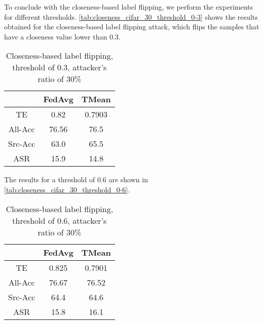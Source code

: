 To conclude with the closeness-based label flipping, we perform the experiments for different thresholds. \autoref{tab:closeness_cifar_30_threshold_0-3} shows the results obtained for the closeness-based label flipping attack, which flips the samples that have a closeness value lower than 0.3.

\begin{table}[h!]
        \centering
        \small
        \begin{adjustbox}{center}
        \begin{tabular}{|c|c|c|}
            \hline
            & FedAvg & TMean \\
            \hline
            TE & 0.82 & 0.7903 \\
            \hline
            All-Acc & 76.56 & 76.5 \\
            \hline
            Src-Acc & 63.0 & 65.5 \\
            \hline
            ASR & 15.9 & 14.8 \\
            \hline
        \end{tabular}
        \end{adjustbox}
        \caption{Closeness-based label flipping, threshold of 0.3, attacker's ratio of 30\%}
        \label{tab:closeness_cifar_30_threshold_0-3}
    \end{table}
    
The results for a threshold of 0.6 are shown in \autoref{tab:closeness_cifar_30_threshold_0-6}.


\begin{table}[h!]
        \centering
        \small
        \begin{adjustbox}{center}
        \begin{tabular}{|c|c|c|}
            \hline
            & FedAvg & TMean \\
            \hline
            TE & 0.825 & 0.7901 \\
            \hline
            All-Acc & 76.67 & 76.52 \\
            \hline
            Src-Acc & 64.4 & 64.6 \\
            \hline
            ASR & 15.8 & 16.1 \\
            \hline
        \end{tabular}
        \end{adjustbox}
        \caption{Closeness-based label flipping, threshold of 0.6, attacker's ratio of 30\%}
        \label{tab:closeness_cifar_30_threshold_0-6}
    \end{table}

